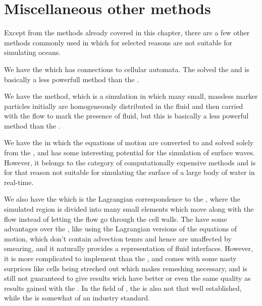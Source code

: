 \section{Miscellaneous other methods}

Except from the methods already covered in this chapter, there are a few other methods commonly used in \CFD which for selected reasons are not suitable for simulating oceans.

We have the \LBM which has connections to cellular automata. The \LBM solved the  and is basically a less powerfull \CFD method than the \FVM.

We have the \MAC method, which is a \FVM simulation in which many small, massless marker particles initially are homogeneously distributed in the fluid and then carried with the flow to mark the presence of fluid, but this is basically a less powerful method than the .

We have the \BEM in which the equations of motion are converted to  and solved solely from the \boundaries, and has some interesting potential for the simulation of surface waves. However, it belongs to the category of computationally expensive methods and is for that reason not suitable for simulating the surface of a large body of water in real-time.

We also have the \FEM which is the Lagrangian correspondence to the \FVM, where the simulated region is divided into many small elements which move along with the flow instead of letting the flow go through the cell walls. The \FEM have some advantages over the \FVM, like using the Lagrangian versions of the equations of motion, which don't contain advection temrs and hence are unaffected by smearing, and it naturally provides a representation of fluid interfaces. However, it is more complicated to implement than the \FVM, and comes with some nasty surprices like cells being streched out which makes remeshing necessary, and is still not guaranteed to give results wich have better or even the same quality as results gained with the \FVM. In the field of \CFD, the \FEM is also not that well established, while the \FVM is somewhat of an industry standard.